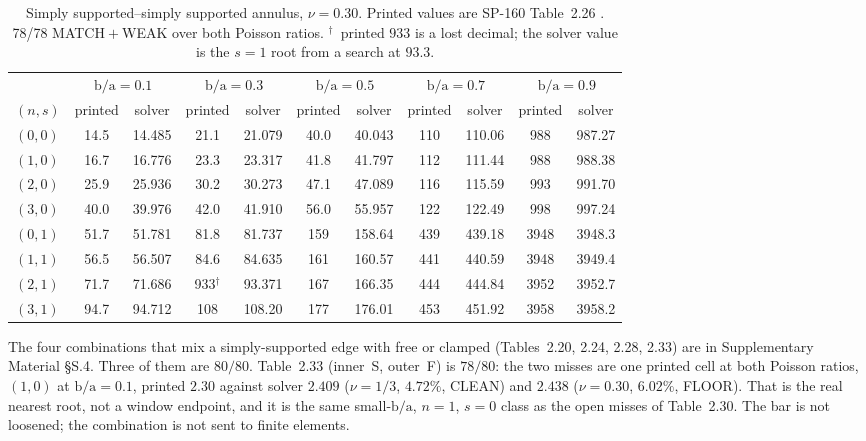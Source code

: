 \documentclass[11pt]{article}
\newcommand{\ba}{\mbox{b/a}}
\begin{document}
\begin{table}[htbp]\centering\footnotesize
\caption{Simply supported--simply supported annulus, $\nu=0.30$. Printed
values are SP-160 Table~2.26 \cite{leissaSP160,vogelSkinner}. 78/78
MATCH${}+{}$WEAK over both Poisson ratios.
$^{\dagger}$~printed $933$ is a lost decimal; the solver value is the
$s=1$ root from a search at $93.3$.}
\label{tab:t226-nu30}
\begin{tabular}{lcccccccccc}
\toprule
& \multicolumn{2}{c}{$\ba=0.1$} & \multicolumn{2}{c}{$\ba=0.3$}
& \multicolumn{2}{c}{$\ba=0.5$} & \multicolumn{2}{c}{$\ba=0.7$}
& \multicolumn{2}{c}{$\ba=0.9$}\\
\cmidrule(lr){2-3}\cmidrule(lr){4-5}\cmidrule(lr){6-7}\cmidrule(lr){8-9}\cmidrule(lr){10-11}
$(n,s)$ & printed & solver & printed & solver & printed & solver
& printed & solver & printed & solver\\
\midrule
$(0,0)$ & 14.5 & 14.485 & 21.1 & 21.079 & 40.0 & 40.043 & 110 & 110.06 & 988 & 987.27 \\
$(1,0)$ & 16.7 & 16.776 & 23.3 & 23.317 & 41.8 & 41.797 & 112 & 111.44 & 988 & 988.38 \\
$(2,0)$ & 25.9 & 25.936 & 30.2 & 30.273 & 47.1 & 47.089 & 116 & 115.59 & 993 & 991.70 \\
$(3,0)$ & 40.0 & 39.976 & 42.0 & 41.910 & 56.0 & 55.957 & 122 & 122.49 & 998 & 997.24 \\
$(0,1)$ & 51.7 & 51.781 & 81.8 & 81.737 & 159 & 158.64 & 439 & 439.18 & 3948 & 3948.3 \\
$(1,1)$ & 56.5 & 56.507 & 84.6 & 84.635 & 161 & 160.57 & 441 & 440.59 & 3948 & 3949.4 \\
$(2,1)$ & 71.7 & 71.686 & 933$^{\dagger}$ & 93.371 & 167 & 166.35 & 444 & 444.84 & 3952 & 3952.7 \\
$(3,1)$ & 94.7 & 94.712 & 108 & 108.20 & 177 & 176.01 & 453 & 451.92 & 3958 & 3958.2 \\
\bottomrule
\end{tabular}
\end{table}

The four combinations that mix a simply-supported edge with free or
clamped (Tables~2.20, 2.24, 2.28, 2.33) are in Supplementary Material
\S{}S.4. Three of them are $80/80$. Table~2.33 (inner~S, outer~F) is
$78/80$: the two misses are one printed cell at both Poisson ratios,
$(1,0)$ at $\ba=0.1$, printed $2.30$ against solver $2.409$ ($\nu=1/3$,
$4.72\%$, CLEAN) and $2.438$ ($\nu=0.30$, $6.02\%$, FLOOR). That is the
real nearest root, not a window endpoint, and it is the same small-$\ba$,
$n=1$, $s=0$ class as the open misses of Table~2.30. The bar is not
loosened; the combination is not sent to finite elements.
\end{document}
